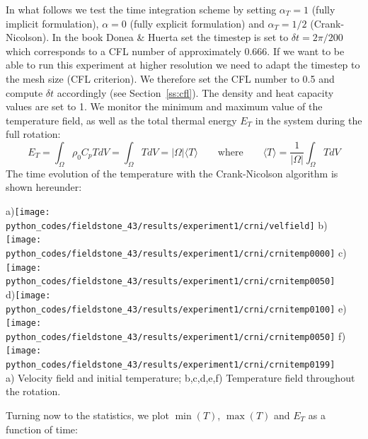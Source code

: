 In what follows we test the time integration scheme by setting $\alpha_T=1$ (fully implicit formulation), $\alpha=0$ (fully explicit formulation) and $\alpha_T=1/2$ (Crank-Nicolson).  
In the book Donea \& Huerta set the timestep is set to $\delta t=2\pi/200$ which corresponds to a CFL number of approximately 0.666. If we want to be able to run this experiment at higher 
resolution we need to adapt the timestep to the mesh size (CFL criterion). We therefore set the CFL number to 0.5 and compute $\delta t$ accordingly (see Section~\ref{ss:cfl}).  
The density and heat capacity values are set to 1. We monitor the minimum and maximum value of the temperature field, as well as the total thermal energy $E_T$ in the 
system during the full rotation:
\[
E_T=\int_\Omega \rho_0 C_p T dV = \int_\Omega T dV = |\Omega| \langle T \rangle 
\qquad
\text{where}
\qquad
\langle T \rangle = \frac{1}{|\Omega|} \int_\Omega T dV
\]
The time evolution of the temperature with the Crank-Nicolson algorithm is shown hereunder:
\begin{center}
a)\texttt{[image: python\_codes/fieldstone\_43/results/experiment1/crni/velfield]}
b)\texttt{[image: python\_codes/fieldstone\_43/results/experiment1/crni/crnitemp0000]}
c)\texttt{[image: python\_codes/fieldstone\_43/results/experiment1/crni/crnitemp0050]}\\
d)\texttt{[image: python\_codes/fieldstone\_43/results/experiment1/crni/crnitemp0100]}
e)\texttt{[image: python\_codes/fieldstone\_43/results/experiment1/crni/crnitemp0050]}
f)\texttt{[image: python\_codes/fieldstone\_43/results/experiment1/crni/crnitemp0199]}\\
{\small a) Velocity field and initial temperature; b,c,d,e,f) Temperature field throughout the rotation.} 
\end{center}
Turning now to the statistics, we plot $\min(T)$, $\max(T)$ and $E_T$ as a function of time:
